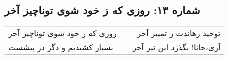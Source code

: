 \begin{center}
\section*{شماره ۱۳: روزی که ز خود شوی توناچیز آخر}
\label{sec:013}
\begin{longtable}{l p{0.5cm} r}
روزی که ز خود شوی توناچیز آخر
&&
توحید رهاندت ز تمییز آخر
\\
بسیار کشیدیم و دگر در پیشست
&&
آری،‌جانا! بگذرد این نیز آخر
\\
\end{longtable}
\end{center}
